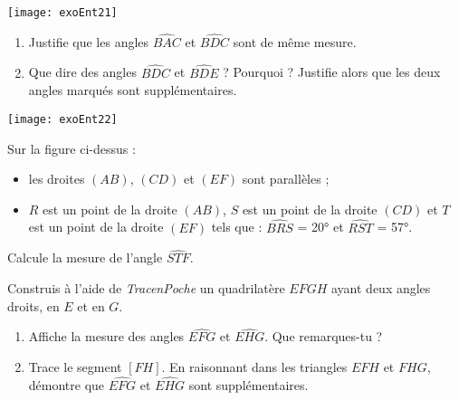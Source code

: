 \begin{exercice}
                        
\begin{center}
    \texttt{[image: exoEnt21]}
\end{center}
                                 
\begin{enumerate}
\item Justifie que les angles $\widehat{BAC}$ et $\widehat{BDC}$ sont de même mesure.
\item Que dire des angles $\widehat{BDC}$ et $\widehat{BDE}$ ? Pourquoi ? Justifie alors que les deux angles marqués sont supplémentaires.
\end{enumerate}
\end{exercice}


\begin{exercice}[Zigzag]

\begin{center}
    \texttt{[image: exoEnt22]}
\end{center}

Sur la figure ci-dessus :
\begin{itemize}
    \item les droites $(AB)$, $(CD)$ et $(EF)$ sont parallèles ;
    \item $R$ est un point de la droite $(AB)$, $S$ est un point de la droite $(CD)$ et $T$ est un point de la droite $(EF)$ tels que : $\widehat{BRS}$ = 20° et $\widehat{RST}$ = 57°.
\end{itemize}

Calcule la mesure de l'angle $\widehat{STF}$.
\end{exercice}


\begin{exercice}
Construis à l'aide de \emph{TracenPoche} un quadrilatère $EFGH$ ayant deux angles droits, en $E$ et en $G$.
\begin{enumerate}
\item Affiche la mesure des angles $\widehat{EFG}$ et $\widehat{EHG}$. Que remarques-tu ?
\item Trace le segment $[FH]$. En raisonnant dans les triangles $EFH$ et $FHG$, démontre que $\widehat{EFG}$ et $\widehat{EHG}$ sont supplémentaires.
\end{enumerate}
\end{exercice}
